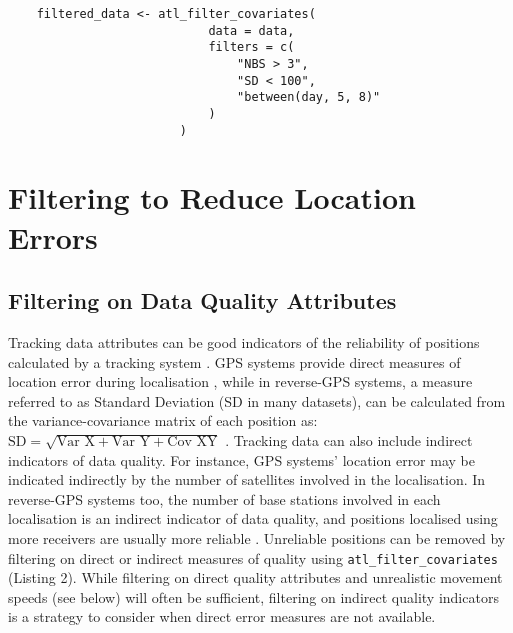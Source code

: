 \begin{refsection}
\begin{lstlisting}
    filtered_data <- atl_filter_covariates(
                            data = data,
                            filters = c(
                                "NBS > 3",
                                "SD < 100",
                                "between(day, 5, 8)"
                            )
                        )                            
    \end{lstlisting}

    \section*{Filtering to Reduce Location Errors}

    \subsection*{Filtering on Data Quality Attributes}

    Tracking data attributes can be good indicators of the reliability of positions calculated by a tracking system \citep{beardsworth2021}.
    GPS systems provide direct measures of location error during localisation \citep[Horizontal Dilution of Precision, HDOP in GPS]{ranacher2016}, while  in reverse-GPS systems, a measure referred to as Standard Deviation (SD in many datasets), can be calculated from the variance-covariance matrix of each position as: $\text{SD} = \sqrt{\text{Var X} + \text{Var Y} + \text{Cov XY}}$ \citep[see details in][]{maccurdy2009, maccurdy2019, weiser2016, ranacher2016}.
    Tracking data can also include indirect indicators of data quality.
    For instance, GPS systems' location error may be indicated indirectly by the number of satellites involved in the localisation.
    In reverse-GPS systems too, the number of base stations involved in each localisation is an indirect indicator of data quality, and positions localised using more receivers are usually more reliable \citep[the minimum required for an ATLAS localisation is 3; see][]{weiser2016, beardsworth2021}.
    Unreliable positions can be removed by filtering on direct or indirect measures of quality using \texttt{atl\_filter\_covariates} (Listing 2).
    While filtering on direct quality attributes and unrealistic movement speeds (see below) will often be sufficient, filtering on indirect quality indicators is a strategy to consider when direct error measures are not available.


\end{refsection}
